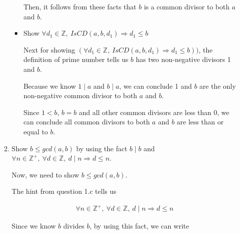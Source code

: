 \documentclass[12pt]{article}
\begin{document}
\begin{enumerate}[a.]
\begin{mdframed}
\begin{enumerate}[1.]
\begin{itemize}
\begin{mdframed}
                \bigskip

                Then, it follows from these facts that $b$ is a common divisor to
                both $a$ and $b$.

                \end{mdframed}

                \item Show $\forall d_1 \in \mathbb{Z},\:IsCD(a,b,d_1) \Rightarrow d_1 \leq b$

                \bigskip

                \begin{mdframed}

                Next for showing $(\forall d_1 \in \mathbb{Z},\:IsCD(a,b,d_1)
                \Rightarrow d_1 \leq b))$, the definition of prime number
                tells us $b$ has two non-negative divisors 1 and $b$.

                \bigskip

                Because we know $1 \mid a$ and $b \mid a$, we can conclude 1 and
                $b$ are the only non-negative common divisor to both $a$ and $b$.

                \bigskip

                Since $1 < b$, $b = b$ and all other common divisors are less than 0,
                we can conclude all common divisors to both $a$ and $b$ are less than or equal to $b$.

                \end{mdframed}
            \end{itemize}

            \item Show $b \leq gcd(a,b)$ by using the fact $b \mid b$ and $\forall n \in
            \mathbb{Z}^{+},\:\forall d \in \mathbb{Z},\:d \mid n \Rightarrow d \leq n$.

            \begin{mdframed}

            Now, we need to show $b \leq gcd(a,b)$.

            \bigskip

            The hint from question 1.c tells us

            \begin{align}
                \forall n \in \mathbb{Z}^{+},\:\forall d \in \mathbb{Z},\:d \mid n \Rightarrow d \leq n
            \end{align}

            Since we know $b$ divides $b$, by using this fact, we can write


\end{mdframed}
\end{enumerate}
\end{mdframed}
\end{enumerate}
\end{document}
